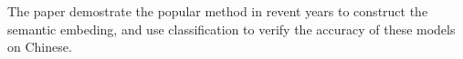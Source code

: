 \begin{abstractEN}

  The  paper demostrate the popular method in revent years to construct the semantic embeding, and use classification to verify the accuracy of these models on Chinese.  

\end{abstractEN}

